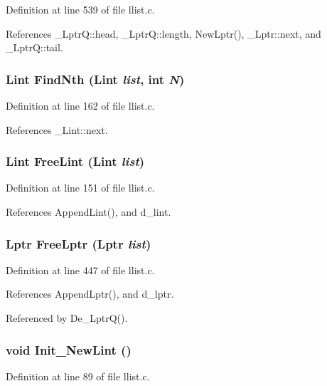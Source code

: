Definition at line 539 of file llist.c.

References \_\-Lptr\-Q::head, \_\-Lptr\-Q::length, New\-Lptr(), \_\-Lptr::next, and \_\-Lptr\-Q::tail.
\subsubsection{\setlength{\rightskip}{0pt plus 5cm}\bf{Lint} Find\-Nth (\bf{Lint} {\em list}, int {\em N})}\label{llist_8c_6e4d57b1412fce1b2b23b76fdc5db19f}




Definition at line 162 of file llist.c.

References \_\-Lint::next.
\subsubsection{\setlength{\rightskip}{0pt plus 5cm}\bf{Lint} Free\-Lint (\bf{Lint} {\em list})}\label{llist_8c_9f36db3dd4aaf36292db4c5f5d89db6f}




Definition at line 151 of file llist.c.

References Append\-Lint(), and d\_\-lint.
\subsubsection{\setlength{\rightskip}{0pt plus 5cm}\bf{Lptr} Free\-Lptr (\bf{Lptr} {\em list})}\label{llist_8c_dfe389f3ed9d48050fbbd5683b647acb}




Definition at line 447 of file llist.c.

References Append\-Lptr(), and d\_\-lptr.

Referenced by De\_\-Lptr\-Q().
\subsubsection{\setlength{\rightskip}{0pt plus 5cm}void Init\_\-New\-Lint ()}\label{llist_8c_eda243cd7190cc0ba7b01c985576141f}




Definition at line 89 of file llist.c.

